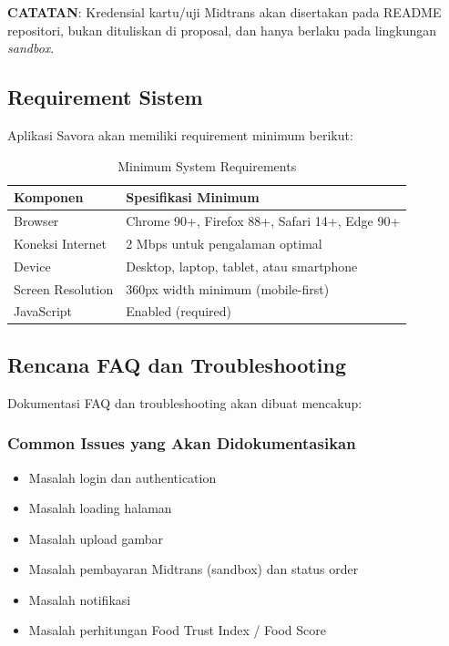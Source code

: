 \textbf{CATATAN}: Kredensial kartu/uji Midtrans akan disertakan pada README repositori, bukan
dituliskan di proposal, dan hanya berlaku pada lingkungan \textit{sandbox}.

\subsection{Requirement Sistem}

Aplikasi Savora akan memiliki requirement minimum berikut:

\begin{table}[htbp]
\centering
\caption{Minimum System Requirements}
\label{tab:requirements}
\begin{tabularx}{\textwidth}{|l|X|}
\hline
\textbf{Komponen} & \textbf{Spesifikasi Minimum} \\
\hline
Browser & Chrome 90+, Firefox 88+, Safari 14+, Edge 90+ \\
\hline
Koneksi Internet & 2 Mbps untuk pengalaman optimal \\
\hline
Device & Desktop, laptop, tablet, atau smartphone \\
\hline
Screen Resolution & 360px width minimum (mobile-first) \\
\hline
JavaScript & Enabled (required) \\
\hline
\end{tabularx}
\end{table}

\subsection{Rencana FAQ dan Troubleshooting}

Dokumentasi FAQ dan troubleshooting akan dibuat mencakup:

\subsubsection{Common Issues yang Akan Didokumentasikan}
\begin{itemize}[leftmargin=*]
    \item Masalah login dan authentication
    \item Masalah loading halaman
    \item Masalah upload gambar
    \item Masalah pembayaran Midtrans (sandbox) dan status order
    \item Masalah notifikasi
    \item Masalah perhitungan Food Trust Index / Food Score
\end{itemize}

